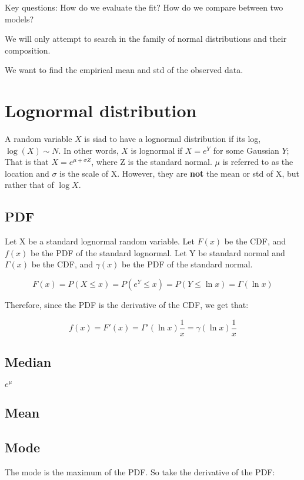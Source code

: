 \documentclass[a4paper]{article}
\begin{document}
Key questions:
How do we evaluate the fit?
How do we compare between two models?

We will only attempt to search in the family of normal distributions and their composition.

We want to find the empirical mean and std of the observed data.

\section{Lognormal distribution}

A random variable $X$ is siad to have a lognormal distribution if its log, $\log(X) \sim N$. In other words, $X$ is lognormal if $X=e^Y$ for some Gaussian $Y$; That is that $X=e^{\mu+\sigma Z}$, where Z is the standard normal. $\mu$ is referred to as the location and $\sigma$ is the scale of X. However, they are \textbf{not} the mean or std of X, but rather that of $\log X$.

\subsection{PDF}

Let X be a standard lognormal random variable. Let $F(x)$ be the CDF, and $f(x)$ be the PDF of the standard lognormal.
Let Y be standard normal and $\Gamma(x)$ be the CDF, and $\gamma(x)$ be the PDF of the standard normal.

\[F(x)=P(X\le x)=P(e^Y \le x)=P(Y \le \ln x)=\Gamma(\ln x)\]

Therefore, since the PDF is the derivative of the CDF, we get that:

\[f(x)=F'(x)=\Gamma'(\ln x)\frac{1}{x}=\gamma(\ln x)\frac{1}{x}\]

\subsection{Median}

$e^\mu$

\subsection{Mean}


\subsection{Mode}

The mode is the maximum of the PDF. So take the derivative of the PDF:
\end{document}
